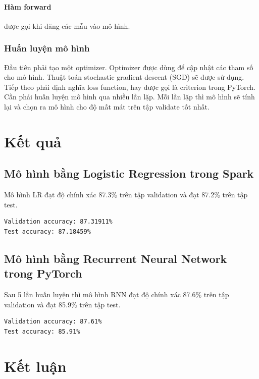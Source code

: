 \documentclass[runningheads]{llncs}
\begin{document}
\paragraph{Hàm forward} được gọi khi đăng các mẫu vào mô hình.

\subsubsection{Huấn luyện mô hình}

Đầu tiên phải tạo một optimizer. Optimizer được dùng để cập nhật các tham số cho mô hình. Thuật toán stochastic gradient descent (SGD) sẽ được sử dụng.
Tiếp theo phải định nghĩa loss function, hay được gọi là criterion trong PyTorch.
Cần phải huấn luyện mô hình qua nhiều lần lặp. Mỗi lần lặp thì mô hình sẽ tính lại và chọn ra mô hình cho độ mất mát trên tập validate tốt nhất.

\section{Kết quả}

\subsection{Mô hình bằng Logistic Regression trong Spark}

Mô hình LR đạt độ chính xác 87.3\% trên tập validation và đạt 87.2\% trên tập test.

\begin{lstlisting}
Validation accuracy: 87.31911%
Test accuracy: 87.18459%
\end{lstlisting}

\subsection{Mô hình bằng Recurrent Neural Network trong PyTorch}

Sau 5 lần huấn luyện thì mô hình RNN đạt độ chính xác 87.6\% trên tập validation và đạt 85.9\% trên tập test.

\begin{lstlisting}
Validation accuracy: 87.61%
Test accuracy: 85.91%
\end{lstlisting}

\section{Kết luận}
\end{document}
